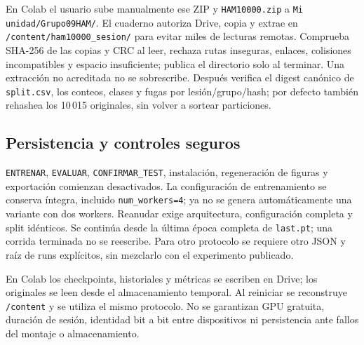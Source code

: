 En Colab el usuario sube manualmente ese ZIP y \texttt{HAM10000.zip} a \texttt{Mi unidad/Grupo09HAM/}. El cuaderno autoriza Drive, copia y extrae en \texttt{/content/ham10000\_sesion/} para evitar miles de lecturas remotas. Comprueba SHA-256 de las copias y CRC al leer, rechaza rutas inseguras, enlaces, colisiones incompatibles y espacio insuficiente; publica el directorio solo al terminar. Una extracción no acreditada no se sobrescribe. Después verifica el digest canónico de \texttt{split.csv}, los conteos, clases y fugas por lesión/grupo/hash; por defecto también rehashea los 10\,015 originales, sin volver a sortear particiones.

\subsection{Persistencia y controles seguros}
\texttt{ENTRENAR}, \texttt{EVALUAR}, \texttt{CONFIRMAR\_TEST}, instalación, regeneración de figuras y exportación comienzan desactivados. La configuración de entrenamiento se conserva íntegra, incluido \texttt{num\_workers=4}; ya no se genera automáticamente una variante con dos workers. Reanudar exige arquitectura, configuración completa y split idénticos. Se continúa desde la última época completa de \texttt{last.pt}; una corrida terminada no se reescribe. Para otro protocolo se requiere otro JSON y raíz de runs explícitos, sin mezclarlo con el experimento publicado.

En Colab los checkpoints, historiales y métricas se escriben en Drive; los originales se leen desde el almacenamiento temporal. Al reiniciar se reconstruye \texttt{/content} y se utiliza el mismo protocolo. No se garantizan GPU gratuita, duración de sesión, identidad bit a bit entre dispositivos ni persistencia ante fallos del montaje o almacenamiento.

